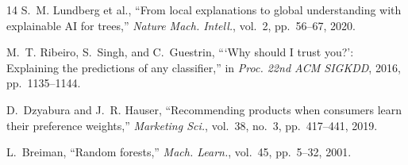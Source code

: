 \documentclass[conference]{IEEEtran}
\begin{document}
\begin{thebibliography}{14}
S.~M. Lundberg et al.,
``From local explanations to global understanding with explainable AI for trees,''
\emph{Nature Mach. Intell.}, vol.~2, pp.~56--67, 2020.

M.~T. Ribeiro, S.~Singh, and C.~Guestrin,
```Why should I trust you?': Explaining the predictions of any classifier,''
in \emph{Proc. 22nd ACM SIGKDD}, 2016, pp.~1135--1144.

D.~Dzyabura and J.~R. Hauser,
``Recommending products when consumers learn their preference weights,''
\emph{Marketing Sci.}, vol.~38, no.~3, pp.~417--441, 2019.

L.~Breiman,
``Random forests,''
\emph{Mach. Learn.}, vol.~45, pp.~5--32, 2001.

\end{thebibliography}
\end{document}
